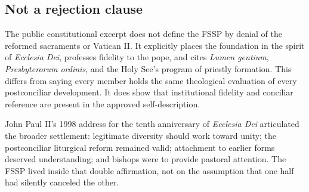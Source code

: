 \subsection{Not a rejection clause}

The public constitutional excerpt does not define the FSSP by denial of the reformed sacraments or Vatican II. It explicitly places the foundation in the spirit of \emph{Ecclesia Dei}, professes fidelity to the pope, and cites \emph{Lumen gentium}, \emph{Presbyterorum ordinis}, and the Holy See's program of priestly formation. This differs from saying every member holds the same theological evaluation of every postconciliar development. It does show that institutional fidelity and conciliar reference are present in the approved self-description.

John Paul II's 1998 address for the tenth anniversary of \emph{Ecclesia Dei} articulated the broader settlement: legitimate diversity should work toward unity; the postconciliar liturgical reform remained valid; attachment to earlier forms deserved understanding; and bishops were to provide pastoral attention. The FSSP lived inside that double affirmation, not on the assumption that one half had silently canceled the other.

